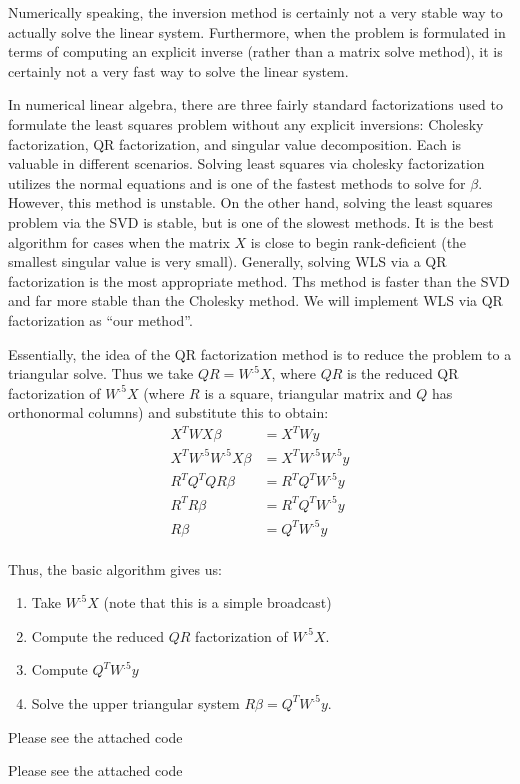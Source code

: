 \documentclass[12pt]{article}
\newenvironment{problem}[2][Exercise]{\begin{trivlist}
\item[\hskip \labelsep {\bfseries #1}\hskip \labelsep {\bfseries #2.}]}{\end{trivlist}}
\begin{document}
\begin{problem}{B}
Numerically speaking, the inversion method is  certainly not a very stable way to actually solve the linear system. 
Furthermore, when the problem is formulated in terms of computing an explicit inverse (rather than a matrix solve method), it is certainly not a very fast way to solve the linear system.

In numerical linear algebra, there are three fairly standard factorizations used to formulate the least squares problem without any explicit inversions: Cholesky factorization, QR factorization, and singular value decomposition.
Each is valuable in different scenarios. 
Solving least squares via cholesky factorization utilizes the normal equations and is one of the fastest methods to solve for $\beta$.
However, this method is unstable.
On the other hand, solving the least squares problem via the SVD is stable, but is one of the slowest methods.
It is the best algorithm for  cases when the matrix $X$ is close to begin rank-deficient (the smallest singular value is very small).
Generally, solving WLS via a QR factorization is the most appropriate method.
Ths method is faster than the SVD and far more stable than the Cholesky method.
We will implement WLS via QR factorization as ``our method''.

Essentially, the idea of the QR factorization method is to reduce the problem to a triangular solve.
Thus we take $QR = W^{.5}X$, where $QR$ is the reduced QR factorization of $W^.5X$ (where $R$ is a square, triangular matrix and $Q$ has orthonormal columns) and substitute this to obtain:
\begin{align*}
X^TWX\beta &= X^T Wy\\
X^TW^{.5}W^{.5}X\beta &= X^T W^{.5}W^{.5}y\\
R^TQ^TQR\beta &= R^TQ^TW^{.5}y\\
R^TR\beta&=R^TQ^TW^{.5}y\\
R\beta &= Q^TW^{.5}y\\
\end{align*}

Thus, the basic algorithm gives us:
\begin{enumerate}
    \item Take $W^{.5}X$ (note that this is a simple broadcast)
    \item Compute the reduced $QR$ factorization of $W^.5X$.
    \item Compute $Q^TW^{.5}y$ 
    \item Solve the upper triangular system $R\beta = Q^TW^{.5}y$.
\end{enumerate}
\end{problem}

\begin{problem}{C}
Please see the attached code
\end{problem}

\begin{problem}{D}
Please see the attached code
\end{problem}
\end{document}
